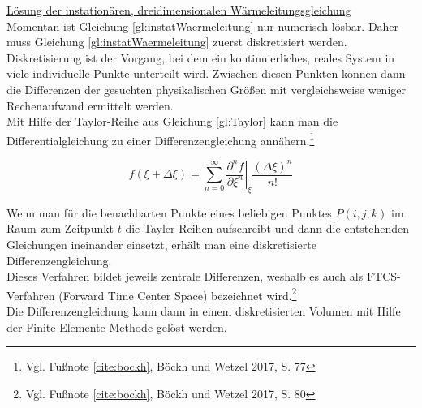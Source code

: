 \underline{Lösung der instationären, dreidimensionalen Wärmeleitungsgleichung}
\\

Momentan ist Gleichung \ref{gl:instatWaermeleitung} nur numerisch lösbar. Daher muss Gleichung \ref{gl:instatWaermeleitung} zuerst diskretisiert werden. Diskretisierung ist der Vorgang, bei dem ein kontinuierliches, reales System in viele individuelle Punkte unterteilt wird. Zwischen diesen Punkten können dann die Differenzen der gesuchten physikalischen Größen mit vergleichsweise weniger Rechenaufwand ermittelt werden. \\
Mit Hilfe der Taylor-Reihe aus Gleichung \ref{gl:Taylor} kann man die Differentialgleichung zu einer Differenzengleichung annähern.\footnote{Vgl. Fußnote \ref{cite:bockh}, Böckh und Wetzel 2017, S. 77}

\begin{equation}
	f(\xi + \Delta \xi) = \sum_{n=0}^{\infty} \left.\frac{\partial^{n} f}{\partial \xi^{n}}\right\vert_{\xi} \frac{(\Delta \xi)^{n}}{n!} \label{gl:Taylor}
\end{equation}

Wenn man für die benachbarten Punkte eines beliebigen Punktes $P(i,j,k)$ im Raum zum Zeitpunkt $t$ die Tayler-Reihen aufschreibt und dann die entstehenden Gleichungen ineinander einsetzt, erhält man eine diskretisierte Differenzengleichung. \\
Dieses Verfahren bildet jeweils zentrale Differenzen, weshalb es auch als FTCS-Verfahren (Forward Time Center Space) bezeichnet wird.\footnote{Vgl. Fußnote \ref{cite:bockh}, Böckh und Wetzel 2017, S. 80} \\ 
Die Differenzengleichung kann dann in einem diskretisierten Volumen mit Hilfe der Finite-Elemente Methode gelöst werden.